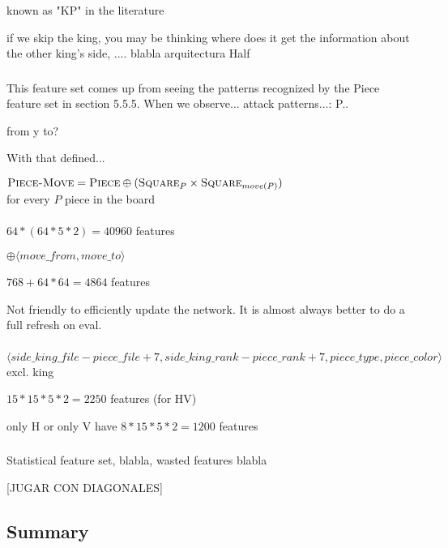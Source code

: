 known as "KP" in the literature

if we skip the king, you may be thinking where does it get the information about the other king's side, .... blabla arquitectura Half

\subsubsection{\mdseries{}}

This feature set comes up from seeing the patterns recognized by the Piece feature set in section 5.5.5. When we observe... attack patterns...:
P..

from y to?

With that defined...

\begin{center}
    $\textsc{Piece-Move} = \textsc{Piece} \oplus (\textsc{Square}_{P} \times \textsc{Square}_{move(P)})$ \\
    for every $P$ piece in the board \\
    ~\\
    $64*(64*5*2)=40960$ features
\end{center}

 $\oplus \langle move\_from, move\_to \rangle$

$768 + 64*64=4864$ features

Not friendly to efficiently update the network. It is almost always better to do a full refresh on eval.


\subsubsection{\mdseries{}}


$\langle side\_king\_file - piece\_file + 7, side\_king\_rank - piece\_rank + 7, piece\_type, piece\_color \rangle$ excl. king

$15*15*5*2=2250$ features (for HV)

only H or only V have $8*15*5*2=1200$ features


\subsubsection{\mdseries{}}

Statistical feature set, blabla, wasted features blabla

[JUGAR CON DIAGONALES]

\subsection{Summary}


